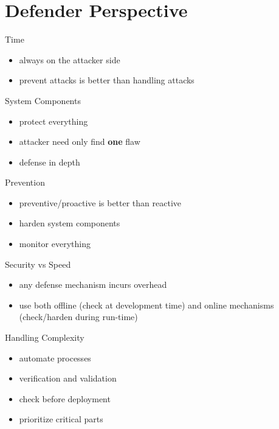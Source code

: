\documentclass{curs}
\begin{document}
\section{Defender Perspective}

\begin{frame}{Time}
  \begin{itemize}
    \item always on the attacker side
    \item prevent attacks is better than handling attacks
  \end{itemize}
\end{frame}

\begin{frame}{System Components}
  \begin{itemize}
    \item protect everything
    \item attacker need only find \textbf{one} flaw
    \item defense in depth
  \end{itemize}
\end{frame}

\begin{frame}{Prevention}
  \begin{itemize}
    \item preventive/proactive is better than reactive
    \item harden system components
    \item monitor everything
  \end{itemize}
\end{frame}

\begin{frame}{Security vs Speed}
  \begin{itemize}
    \item any defense mechanism incurs overhead
    \item use both offline (check at development time) and online mechanisms (check/harden during run-time)
  \end{itemize}
\end{frame}

\begin{frame}{Handling Complexity}
  \begin{itemize}
    \item automate processes
    \item verification and validation
    \item check before deployment
    \item prioritize critical parts
  \end{itemize}
\end{frame}
\end{document}
